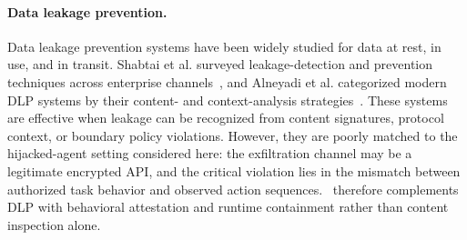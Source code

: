 \paragraph{Data leakage prevention.}
Data leakage prevention systems have been widely studied for data at rest, in use, and in transit. Shabtai et al. surveyed leakage-detection and prevention techniques across enterprise channels~\cite{shabtai2012dlp}, and Alneyadi et al. categorized modern DLP systems by their content- and context-analysis strategies~\cite{alneyadi2016dlp}. These systems are effective when leakage can be recognized from content signatures, protocol context, or boundary policy violations. However, they are poorly matched to the hijacked-agent setting considered here: the exfiltration channel may be a legitimate encrypted API, and the critical violation lies in the mismatch between authorized task behavior and observed action sequences. \projectname~therefore complements DLP with behavioral attestation and runtime containment rather than content inspection alone.
